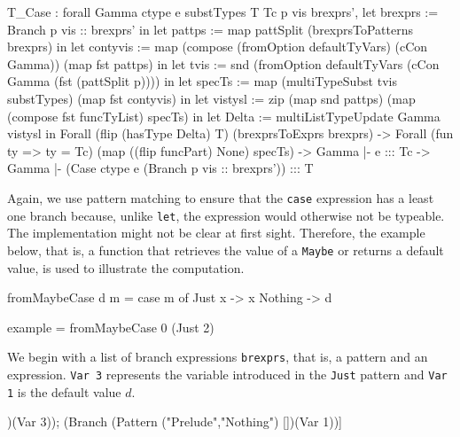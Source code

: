 \documentclass[paper = a4, fleqn, abstract=on, twoside]{scrreprt}
\begin{document}
\begin{coqcode}
T_Case : forall Gamma ctype e substTypes T Tc p vis brexprs',
           let  brexprs := Branch p vis :: brexprs' in
           let   pattps := map pattSplit (brexprsToPatterns brexprs) in
           let contyvis := map (compose (fromOption defaultTyVars) (cCon Gamma))
                               (map fst pattps) in
           let     tvis := snd (fromOption defaultTyVars 
                                           (cCon Gamma (fst (pattSplit p)))) in
           let   specTs := map (multiTypeSubst tvis substTypes)
                               (map fst contyvis) in
           let  vistysl := zip (map snd pattps)
                               (map (compose fst funcTyList) specTs) in
           let    Delta := multiListTypeUpdate Gamma vistysl
            in Forall (flip (hasType Delta) T) (brexprsToExprs brexprs) ->
               Forall (fun ty => ty = Tc) (map ((flip funcPart) None) specTs) ->
               Gamma |- e ::: Tc ->
         Gamma |- (Case ctype e (Branch p vis :: brexprs')) ::: T
\end{coqcode}
Again, we use pattern matching to ensure that the \texttt{case} expression has a least one branch because, unlike \texttt{let}, the expression would otherwise not be typeable. The implementation might not be clear at first sight. Therefore, the example below, that is, a function that retrieves the value of a \texttt{Maybe} or returns a default value, is used to illustrate the computation.
\begin{flushleft}
	\begin{minipage}[t]{.45 \linewidth}
		\begin{coqcode}
fromMaybeCase d m = case m of
                      Just x  -> x
                      Nothing -> d
		\end{coqcode}
	\end{minipage}
	\hfill
	\vrule
	\vspace{.5em}
	\begin{minipage}[t]{.5 \linewidth}
		\begin{coqcode}
example = fromMaybeCase 0 (Just 2)
		\end{coqcode}
	\end{minipage}
\end{flushleft}
We begin with a list of branch expressions \texttt{brexprs}, that is, a pattern and an expression. \texttt{Var 3} represents the variable introduced in the \texttt{Just} pattern and \texttt{Var 1} is the default value $d$.
\begin{coqcode}
[(Branch (Pattern ("Prelude","Just")   [3])(Var 3));
 (Branch (Pattern ("Prelude","Nothing") [])(Var 1))]
\end{coqcode}
\end{document}
